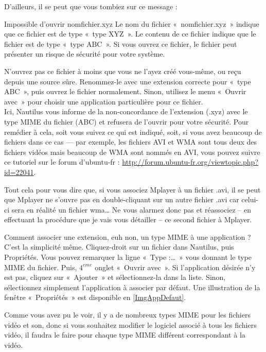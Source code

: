 D'ailleurs, il se peut que vous tombiez sur ce message :
\begin{citationlongue}{Impossible d'ouvrir nomfichier.xyz}
Le nom du fichier «~nomfichier.xyz~» indique que ce fichier est de type «~type XYZ~». Le contenu de ce fichier indique que le fichier est de type «~type ABC~». Si vous ouvrez ce fichier, le fichier peut présenter un risque de sécurité pour votre système.
\end{citationlongue}
N'ouvrez pas ce fichier à moins que vous ne l'ayez créé vous-même, ou reçu depuis une source sûre. Renommez-le avec une extension correcte pour «~type ABC~», puis ouvrez le fichier normalement. Sinon, utilisez le menu «~Ouvrir avec~» pour choisir une application particulière pour ce fichier.\\
Ici, Nautilus vous informe de la non-concordance de l'extension (.xyz) avec le type MIME du fichier (ABC) et refusera de l'ouvrir pour votre sécurité. Pour remédier à cela, soit vous suivez ce qui est indiqué, soit, si vous avez beaucoup de fichiers dans ce cas --- par exemple, les fichiers AVI et WMA sont tous deux des fichiers vidéos mais beaucoup de WMA sont nommés en AVI, vous pouvez suivre ce tutoriel sur le forum d'ubuntu-fr : \url{http://forum.ubuntu-fr.org/viewtopic.php?id=22041}.\par
Tout cela pour vous dire que, si vous associez Mplayer à un fichier .avi, il se peut que Mplayer ne s'ouvre pas en double-cliquant sur un autre fichier .avi car celui-ci sera en réalité un fichier wma\ldots{} Ne vous alarmez donc pas et réassociez -- en effectuant la procédure que je vais vous détailler -- ce second fichier à Mplayer.\par
Comment associer une extension, euh non, un type MIME à une application ?\\
C'est la simplicité même. Cliquez-droit sur un fichier dans Nautilus, puis Propriétés. Vous pouvez remarquer la ligne «~Type :\ldots{}~» vous donnant le type MIME du fichier. Puis, $4^{eme}$ onglet «~Ouvrir avec~». Si l'application désirée n'y est pas, cliquez sur «~Ajouter~» et sélectionnez-la dans la liste. Sinon, sélectionnez simplement l'application à associer par défaut. Une illustration de la fenêtre «~Propriétés~» est disponible en \ref{ImgAppDefaut}.\par
{}
\begin{nota}
Comme vous avez pu le voir, il y a de nombreux types MIME pour les fichiers vidéo et son, donc si vous souhaitez modifier le logiciel associé à tous les fichiers vidéo, il faudra le faire pour chaque type MIME différent correspondant à la vidéo.
\end{nota}

